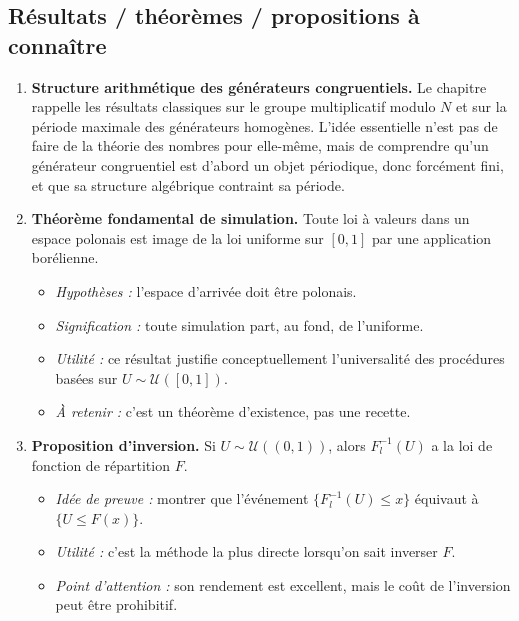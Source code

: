 \documentclass[11pt,a4paper]{article}
\begin{document}
\subsection{Résultats / théorèmes / propositions à connaître}

\begin{enumerate}[label=\textbf{\arabic*.}]
  \item \textbf{Structure arithmétique des générateurs congruentiels.} Le chapitre rappelle les résultats classiques sur le groupe multiplicatif modulo $N$ et sur la période maximale des générateurs homogènes. L'idée essentielle n'est pas de faire de la théorie des nombres pour elle-même, mais de comprendre qu'un générateur congruentiel est d'abord un objet périodique, donc forcément fini, et que sa structure algébrique contraint sa période.

  \item \textbf{Théorème fondamental de simulation.} Toute loi à valeurs dans un espace polonais est image de la loi uniforme sur $[0,1]$ par une application borélienne.
  \begin{itemize}
    \item \emph{Hypothèses :} l'espace d'arrivée doit être polonais.
    \item \emph{Signification :} toute simulation part, au fond, de l'uniforme.
    \item \emph{Utilité :} ce résultat justifie conceptuellement l'universalité des procédures basées sur $U\sim\mathcal U([0,1])$.
    \item \emph{À retenir :} c'est un théorème d'existence, pas une recette.
  \end{itemize}

  \item \textbf{Proposition d'inversion.} Si $U\sim\mathcal U((0,1))$, alors $F_l^{-1}(U)$ a la loi de fonction de répartition $F$.
  \begin{itemize}
    \item \emph{Idée de preuve :} montrer que l'événement $\{F_l^{-1}(U)\le x\}$ équivaut à $\{U\le F(x)\}$.
    \item \emph{Utilité :} c'est la méthode la plus directe lorsqu'on sait inverser $F$.
    \item \emph{Point d'attention :} son rendement est excellent, mais le coût de l'inversion peut être prohibitif.
  \end{itemize}


\end{enumerate}
\end{document}
